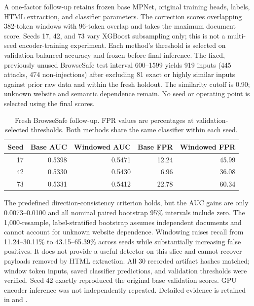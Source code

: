 \documentclass[11pt, a4paper]{article}
\begin{document}
A one-factor follow-up retains frozen base MPNet, original training heads,
labels, HTML extraction, and classifier parameters. The correction scores
overlapping 382-token windows with 96-token overlap and takes the maximum
document score. Seeds 17, 42, and 73 vary XGBoost subsampling only; this is
not a multi-seed encoder-training experiment. Each method's threshold is
selected on validation balanced accuracy and frozen before final inference.
The fixed, previously unused BrowseSafe test interval 600--1599 yields
919 inputs (445 attacks, 474 non-injections) after excluding 81 exact or
highly similar inputs against prior raw data and within the fresh holdout.
The similarity cutoff is 0.90; unknown website and semantic dependence
remain. No seed or operating point is selected using the final scores.

\begin{table}[htbp]
\centering
\caption{Fresh BrowseSafe follow-up. FPR values are percentages at
validation-selected thresholds. Both methods share the same classifier
within each seed.}
\begin{tabular}{rrrrr}
\toprule
Seed & Base AUC & Windowed AUC & Base FPR & Windowed FPR \\
\midrule
17 & 0.5398 & 0.5471 & 12.24 & 45.99 \\
42 & 0.5330 & 0.5430 & 6.96 & 36.08 \\
73 & 0.5331 & 0.5412 & 22.78 & 60.34 \\
\bottomrule
\end{tabular}
\label{tab:windowed-followup}
\end{table}

The predefined direction-consistency criterion holds, but the AUC gains
are only 0.0073--0.0100 and all nominal paired bootstrap 95\% intervals
include zero. The 1,000-resample, label-stratified bootstrap assumes
independent documents and cannot account for unknown website dependence.
Windowing raises recall from 11.24--30.11\% to 43.15--65.39\% across seeds
while substantially increasing false positives. It does not provide a
useful detector on this slice and cannot recover payloads removed by HTML
extraction. All 30 recorded artifact hashes matched; window token inputs,
saved classifier predictions, and validation thresholds were verified.
Seed 42 exactly reproduced the original base validation scores. GPU encoder
inference was not independently repeated. Detailed evidence is retained in
 and
.
\end{document}
